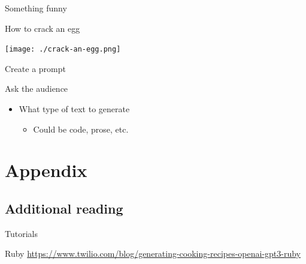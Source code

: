 \documentclass[presentation]{beamer}
\begin{document}
\begin{frame}[label={sec:org13fa9d8}]{Something funny}
\begin{block}{How to crack an egg}
\begin{center}
\texttt{[image: ./crack-an-egg.png]}
\end{center}
\end{block}
\end{frame}

\begin{frame}[label={sec:org8298fa7}]{Create a prompt}
\begin{block}{Ask the audience}
\begin{itemize}
\item What type of text to generate
\begin{itemize}
\item Could be code, prose, etc.
\end{itemize}
\end{itemize}
\end{block}
\end{frame}

\section{Appendix}
\label{sec:orgb95170a}
\subsection{Additional reading}
\label{sec:orge00ddd3}
\begin{frame}[label={sec:orgaa740ab}]{Tutorials}
\begin{block}{Ruby}
{\footnotesize
\url{https://www.twilio.com/blog/generating-cooking-recipes-openai-gpt3-ruby}
}
\end{block}
\end{frame}
\end{document}
